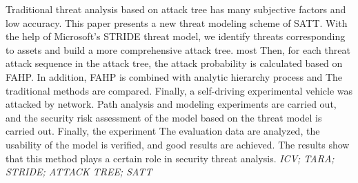   Traditional threat analysis based on attack tree has many subjective factors and low accuracy. This paper presents a new threat modeling scheme of SATT.
  With the help of Microsoft's STRIDE threat model, we identify threats corresponding to assets and build a more comprehensive attack tree. most
  Then, for each threat attack sequence in the attack tree, the attack probability is calculated based on FAHP. In addition, FAHP is combined with analytic hierarchy process and
  The traditional methods are compared. Finally, a self-driving experimental vehicle was attacked by network.
  Path analysis and modeling experiments are carried out, and the security risk assessment of the model based on the threat model is carried out. Finally, the experiment
  The evaluation data are analyzed, the usability of the model is verified, and good results are achieved.
  The results show that this method plays a certain role in security threat analysis.
{}\textit{ICV; TARA; STRIDE; ATTACK TREE; SATT}